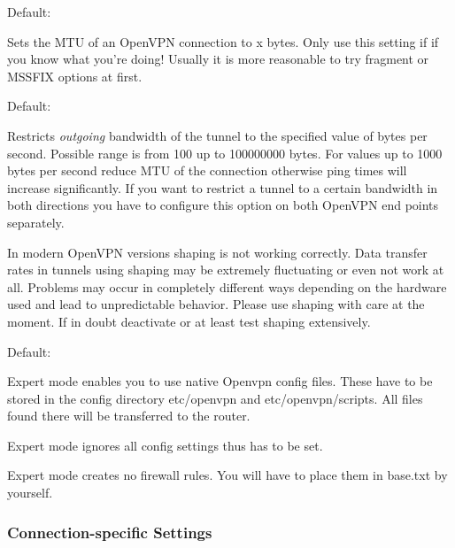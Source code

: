 \begin{description}

  Default: 

  Sets the MTU of an OpenVPN connection to x bytes. Only use this setting if 
  if you know what you're doing! Usually it is more reasonable to try fragment 
  or MSSFIX options at first.


  Default: 

  Restricts \emph{outgoing} bandwidth of the tunnel to the specified value 
  of bytes per second. Possible range is from 100 up to 100000000 bytes. 
  For values up to 1000 bytes per second reduce MTU of the connection 
  otherwise ping times will increase significantly. If you want to restrict 
  a tunnel to a certain bandwidth in both directions you have to configure 
  this option on both OpenVPN end points separately.

  In modern OpenVPN versions shaping is not working correctly. Data transfer 
  rates in tunnels using shaping may be extremely fluctuating or even not work 
  at all. Problems may occur in completely different ways depending on the 
  hardware used and lead to unpredictable behavior. Please use shaping with 
  care at the moment. If in doubt deactivate or at least test shaping 
  extensively.
  

  Default: 

  Expert mode enables you to use native Openvpn config files. These have 
  to be stored in the config directory etc/openvpn and etc/openvpn/scripts.
  All files found there will be transferred to the router.

  Expert mode ignores all config settings thus  
  has to be set.

  Expert mode creates no firewall rules. You will have to place them in 
  base.txt by yourself.

\end{description}

\subsubsection{Connection-specific Settings}

